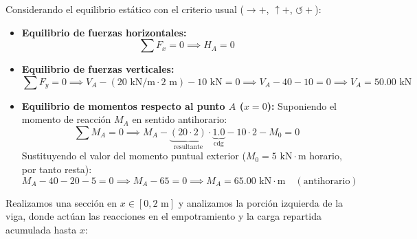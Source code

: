 Considerando el equilibrio estático con el criterio usual ($\rightarrow +$, $\uparrow +$, $\circlearrowleft +$):

\begin{itemize}
    \item \textbf{Equilibrio de fuerzas horizontales:}
          \begin{equation}
              \sum F_x = 0 \implies \boxed{H_A = 0}
          \end{equation}

    \item \textbf{Equilibrio de fuerzas verticales:}
          \begin{equation}
              \sum F_y = 0 \implies V_A - (20\text{ kN/m} \cdot 2\text{ m}) - 10\text{ kN} = 0 \implies V_A - 40 - 10 = 0 \implies \boxed{V_A = 50.00\text{ kN}}
          \end{equation}

    \item \textbf{Equilibrio de momentos respecto al punto $A$ ($x = 0$):}
          Suponiendo el momento de reacción $M_A$ en sentido antihorario:
          \begin{equation}
              \sum M_A = 0 \implies M_A - \underbrace{(20 \cdot 2)}_{\text{resultante}} \cdot \underbrace{1.0}_{\text{cdg}} - 10 \cdot 2 - M_0 = 0
          \end{equation}
          Sustituyendo el valor del momento puntual exterior ($M_0 = 5\text{ kN}\cdot\text{m}$ horario, por tanto resta):
          \begin{equation}
              M_A - 40 - 20 - 5 = 0 \implies M_A - 65 = 0 \implies \boxed{M_A = 65.00\text{ kN}\cdot\text{m}} \quad (\text{antihorario})
          \end{equation}
\end{itemize}



Realizamos una sección en $x \in [0, 2\text{ m}]$ y analizamos la porción izquierda de la viga, donde actúan las reacciones en el empotramiento y la carga repartida acumulada hasta $x$:

